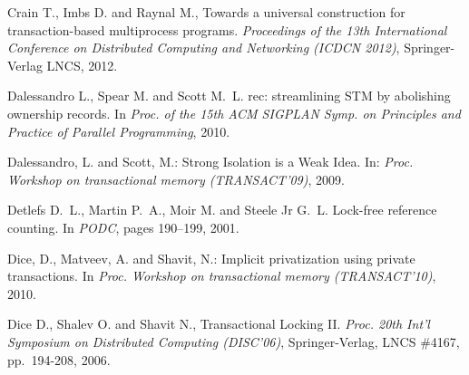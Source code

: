 \begin{thebibliography}{99}
{
Crain T., Imbs D. and Raynal M.,
Towards a universal construction for transaction-based multiprocess programs.
{\it Proceedings of the 13th International Conference on Distributed Computing and Networking (ICDCN 2012)}, 
Springer-Verlag LNCS, 2012.




Dalessandro L., Spear M. and Scott M.~L.
rec: streamlining {STM} by abolishing ownership records.
\newblock In {\em Proc. of the 15th ACM SIGPLAN Symp. on Principles and
  Practice of Parallel Programming}, 2010.





Dalessandro, L. and Scott, M.:
Strong Isolation is a Weak Idea. 
In: {\it Proc. Workshop on transactional memory (TRANSACT'09)}, 2009.




Detlefs D.~L., Martin P.~A., Moir M. and Steele Jr G.~L.
\newblock Lock-free reference counting.
\newblock In {\em PODC}, pages 190--199, 2001.


Dice, D., Matveev, A. and  Shavit, N.:
\newblock Implicit privatization using private transactions. 
\newblock In {\em Proc. Workshop on transactional memory (TRANSACT'10)}, 2010.


Dice D., Shalev O. and Shavit N.,
Transactional Locking II.
{\em Proc. 20th Int'l Symposium on Distributed Computing (DISC'06)},
Springer-Verlag, LNCS \#4167, pp.~194-208, 2006.

% 
% 
% 
% 




}
\end{thebibliography}
